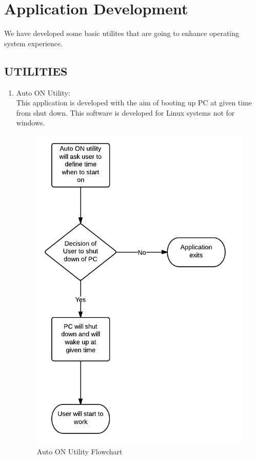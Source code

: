 \chapter{Application Development}
We have developed some basic utilites that are going to enhance operating system experience.

\section{UTILITIES}
\begin{enumerate}

\item Auto ON Utility:\\
This application is developed with the aim of booting up PC at given time from shut down. This software is developed for Linux systems not for windows.
\begin{figure}[h]
\begin{center}
  \includegraphics [scale=0.8] {aoutil.png}
  \caption[Auto ON Utility]{Auto ON Utility Flowchart}
\end{center}
\end{figure}


\end{enumerate}
